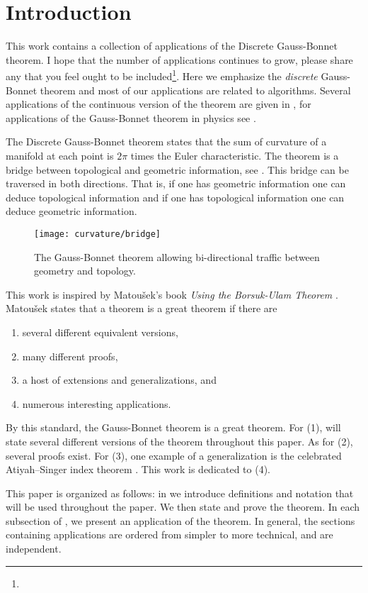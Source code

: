 \section{Introduction}
\label{sec:intro}

This work contains a collection of applications of the 
Discrete Gauss-Bonnet theorem.
I hope that the number of applications continues to grow,
please share any that you feel
ought to  be included\footnote{}.
Here we emphasize the \emph{discrete} Gauss-Bonnet
theorem and most of our applications are related to algorithms. 
Several applications of the continuous version of the theorem
are given in \cite{doc76}, for applications of the Gauss-Bonnet 
theorem in physics see \cite{tirado-physics-apps}.

The Discrete Gauss-Bonnet theorem states that the sum of curvature
of a manifold at each point is $2\pi$ times the Euler characteristic.
The theorem is a bridge between topological
and geometric information, see . 
This bridge can be traversed in both directions.
That is, if one has geometric information one can deduce topological information and
if one has topological information one can deduce geometric information.


\begin{figure}[htb]
\centering
\texttt{[image: curvature/bridge]}
\caption{The Gauss-Bonnet theorem allowing bi-directional traffic
between geometry and topology.}
\label{fig:bridge}
\end{figure}

This work is inspired by Matou\v{s}ek's book \emph{Using the Borsuk-Ulam Theorem}
\cite{jm08}.
Matou\v{s}ek states that a theorem is a great theorem if there are
\begin{enumerate}[(1)]
\item several different equivalent versions,
\item many different proofs,
\item a host of extensions and generalizations, and
\item numerous interesting applications.
\end{enumerate}

By this standard, the Gauss-Bonnet theorem is a great theorem.
For (1), will state several different versions of the theorem throughout this paper.
As for (2), several proofs exist.
For (3), one example of a generalization is the celebrated Atiyah–Singer index 
theorem \cite{atiyah_index_1963}.
This work is dedicated to (4).

This paper is organized as follows:
in  we introduce definitions and notation that will be used
throughout the paper. We then state and prove the theorem.
In each subsection of , we present an application of the theorem.
In general, the sections containing applications are ordered from simpler to more technical,
and are independent.


